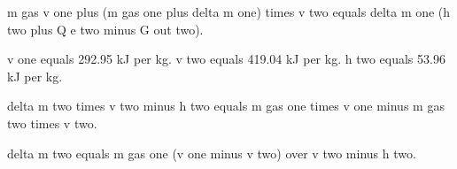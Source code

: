 m gas v one plus (m gas one plus delta m one) times v two equals delta m one (h two plus Q e two minus G out two).

v one equals 292.95 kJ per kg.
v two equals 419.04 kJ per kg.
h two equals 53.96 kJ per kg.

delta m two times v two minus h two equals m gas one times v one minus m gas two times v two.

delta m two equals m gas one (v one minus v two) over v two minus h two.